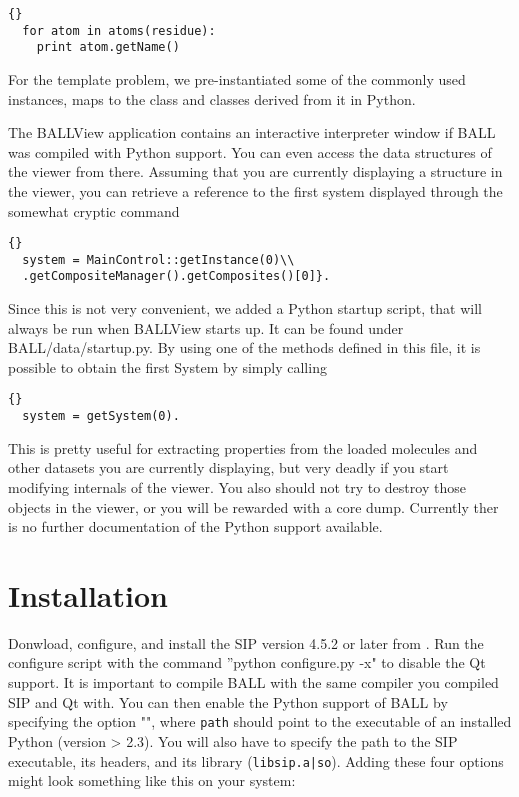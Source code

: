 \begin{lstlisting}{}
  for atom in atoms(residue):
    print atom.getName()
\end{lstlisting}

\noindent For the template problem, we pre-instantiated some of the 
commonly used instances, \eg {} maps to the 
 class and classes derived from it in Python.

The BALLView application contains an interactive interpreter window
if BALL was compiled with Python support. You can even access the
data structures of the viewer from there. Assuming that you are
currently displaying a structure in the viewer, you can retrieve a
reference to the first system displayed through the somewhat cryptic
command 

\begin{lstlisting}{}
  system = MainControl::getInstance(0)\\
  .getCompositeManager().getComposites()[0]}.
\end{lstlisting}

Since this is not very convenient, we added a Python startup script,
that will always be run when BALLView starts up. It can be found
under BALL/data/startup.py. By using one of the methods defined in this file,
it is possible to obtain the first System by simply calling

\begin{lstlisting}{}
  system = getSystem(0).
\end{lstlisting}

This is pretty useful for extracting properties from the loaded molecules
and other datasets you are
currently displaying, but very deadly if you start modifying internals
of the viewer. You also should not try to destroy those objects in the
viewer, or you will be rewarded with a core dump. Currently ther is no further
documentation of the Python support available.
		

\section{Installation}

Donwload, configure, and install the SIP version 4.5.2 or later from 
.
Run the configure script with the command ''python configure.py -x" to
disable the Qt support. It is important to compile BALL 
with the same \CPP compiler you compiled SIP and Qt with. You can then enable the Python support of BALL
by specifying the option \mbox{""}, where
{\tt path} should point to the executable of an installed Python (version >
2.3). You will also have to specify the path to the SIP executable, its
headers, and its library ({\tt libsip.a|so}). Adding these four options might
look something like this on your system:


